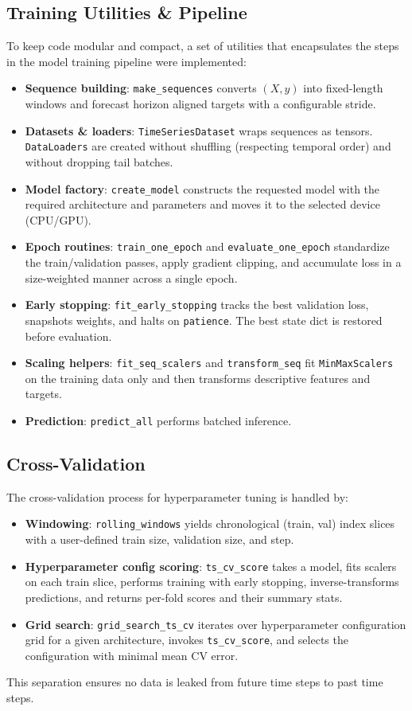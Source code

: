 \documentclass[conference]{IEEEtran}
\begin{document}
\subsection{\textbf{Training Utilities \& Pipeline}}
To keep code modular and compact, a set of utilities that encapsulates the steps in the model training pipeline were implemented:
\begin{itemize}
    \item \textbf{Sequence building}: \texttt{make\_sequences} converts $(X,y)$ into fixed-length windows and forecast horizon aligned targets with a configurable stride.
    \item \textbf{Datasets \& loaders}: \texttt{TimeSeriesDataset} wraps sequences as tensors. \texttt{DataLoaders} are created without shuffling (respecting temporal order) and without dropping tail batches.
    \item \textbf{Model factory}: \texttt{create\_model} constructs the requested model with the required architecture and parameters and moves it to the selected device (CPU/GPU).
    \item \textbf{Epoch routines}: \texttt{train\_one\_epoch} and \texttt{evaluate\_one\_epoch} standardize the train/validation passes, apply gradient clipping, and accumulate loss in a size-weighted manner across a single epoch.
    \item \textbf{Early stopping}: \texttt{fit\_early\_stopping} tracks the best validation loss, snapshots weights, and halts on \texttt{patience}. The best state dict is restored before evaluation.
    \item \textbf{Scaling helpers}: \texttt{fit\_seq\_scalers} and \texttt{transform\_seq} fit \texttt{MinMaxScalers} on the training data only and then transforms descriptive features and targets.
    \item \textbf{Prediction}: \texttt{predict\_all} performs batched inference.
\end{itemize}

\subsection{\textbf{Cross-Validation}}
The cross-validation process for hyperparameter tuning is handled by:
\begin{itemize}
    \item \textbf{Windowing}: \texttt{rolling\_windows} yields chronological (train, val) index slices with a user-defined train size, validation size, and step.
    \item \textbf{Hyperparameter config scoring}: \texttt{ts\_cv\_score} takes a model, fits scalers on each train slice, performs training with early stopping, inverse-transforms predictions, and returns per-fold scores and their summary stats.
    \item \textbf{Grid search}: \texttt{grid\_search\_ts\_cv} iterates over hyperparameter configuration grid for a given architecture, invokes \texttt{ts\_cv\_score}, and selects the configuration with minimal mean CV error.
\end{itemize}
This separation ensures no data is leaked from future time steps to past time steps.
\end{document}

